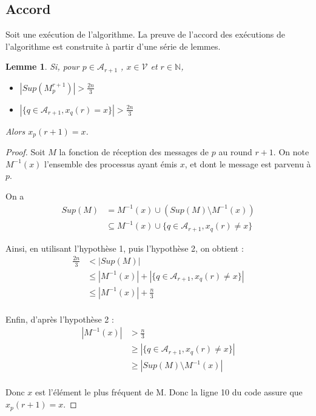 \documentclass{article}
\newtheorem{lemma}{Lemme}[section]
\begin{document}
\subsection{Accord}

Soit une exécution de l'algorithme.
La preuve de l'accord des exécutions de l'algorithme est construite à partir d'une série de lemmes.

\begin{lemma}

	Si, pour $p \in \mathcal{A}_{r+1}$ , $x \in \mathcal{V}$ et $r \in \mathds{N}$, 

\begin{itemize}

	\item $| Sup(M_p^{r+1}) | > \frac{2 n}{3}$
	\item $| \{ q \in \mathcal{A}_{r+1} , x_q(r) = x \} | > \frac{2 n}{3}$

\end{itemize}

Alors $x_p(r+1) = x$.

\end{lemma}

\begin{proof}

	Soit $M$ la fonction de réception des messages de $p$ au round $r+1$. On note $M^{-1}(x)$ l'ensemble des processus ayant émis $x$, et dont le message est parvenu à $p$.

	On a
\begin{equation}
\begin{split}
	Sup(M) & = M^{-1}(x) \cup (Sup(M) \setminus M^{-1}(x)) \\
	& \subseteq M^{-1}(x) \cup \{ q \in \mathcal{A}_{r+1} , x_q(r) \neq x \}
\end{split}
\end{equation}

	Ainsi, en utilisant l'hypothèse 1, puis l'hypothèse 2, on obtient : 
\begin{equation}
\begin{split}
	\frac{2 n}{3} & < | Sup(M) | \\
		& \leq | M^{-1}(x) | + | \{ q \in \mathcal{A}_{r+1} , x_q(r) \neq x \} | \\
		& \leq | M^{-1}(x) | +  \frac{ n}{3} \\
\end{split}
\end{equation}


	Enfin, d'après l'hypothèse 2 :
\begin{equation}
\begin{split}
| M^{-1}(x) | & > \frac{ n}{3} \\
		& \geq | \{ q \in \mathcal{A}_{r+1} , x_q(r) \neq x \} | \\
		& \geq | Sup(M) \setminus M^{-1}(x) | \\
\end{split}
\end{equation}

Donc $x$ est l'élément le plus fréquent de M. Donc la ligne 10 du code assure que $x_p(r+1) = x$.

\end{proof}
\end{document}
